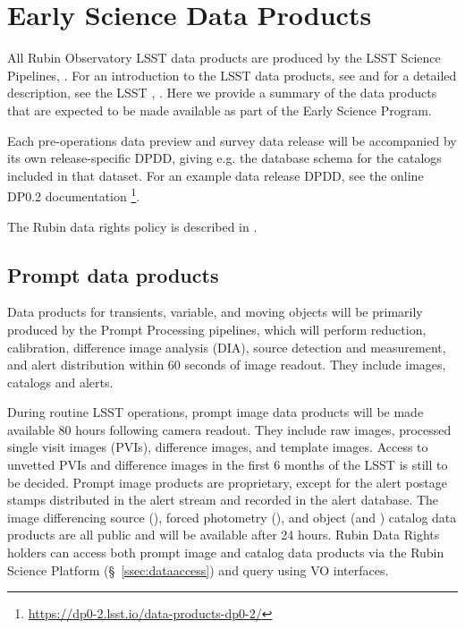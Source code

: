\section{Early Science Data Products}
\label{sec:data}

All Rubin Observatory LSST data products are produced by the LSST Science Pipelines, \cite{2019ASPC..523..521B,2018PASJ...70S...5B}. 
For an introduction to the LSST data products, see \citet{RubinDataProductsAbridged} and for a detailed description, see the LSST \dpdd,  \citet{LSE-163}.
Here we provide a summary of the data products that are expected to be made available as part of the Early Science Program.

Each pre-operations data preview and survey data release will be accompanied by its own release-specific DPDD, giving e.g. the  database schema for the catalogs included in that dataset.
For an example data release DPDD, see the online DP0.2 documentation \footnote{\url{https://dp0-2.lsst.io/data-products-dp0-2/}}.

The Rubin data rights policy is described in  \cite{RDO-013}.

\subsection{Prompt data products}

Data products for transients, variable, and moving objects will be primarily produced by the Prompt Processing pipelines, which will perform reduction, calibration, difference image analysis (DIA), source detection and measurement, and alert distribution within 60 seconds of image readout.
They include images, catalogs and alerts.

During routine LSST operations, prompt image data products will be made available 80 hours following camera readout.
They include raw images, processed single visit images (PVIs), difference images, and template images.
Access to unvetted PVIs and difference images in the first 6 months of the LSST is still to be decided.
Prompt image products are proprietary, except for the alert postage stamps distributed in the alert stream and recorded in the alert database.
The image differencing source (\DIASource), forced photometry (\DIAForcedSource), and object (\DIAObject and \SSObject)
catalog data products are all public and will be available after 24 hours.
Rubin Data Rights holders can access both prompt image and catalog data products via the Rubin Science Platform (\S~\ref{ssec:dataaccess}) and query using VO interfaces.

